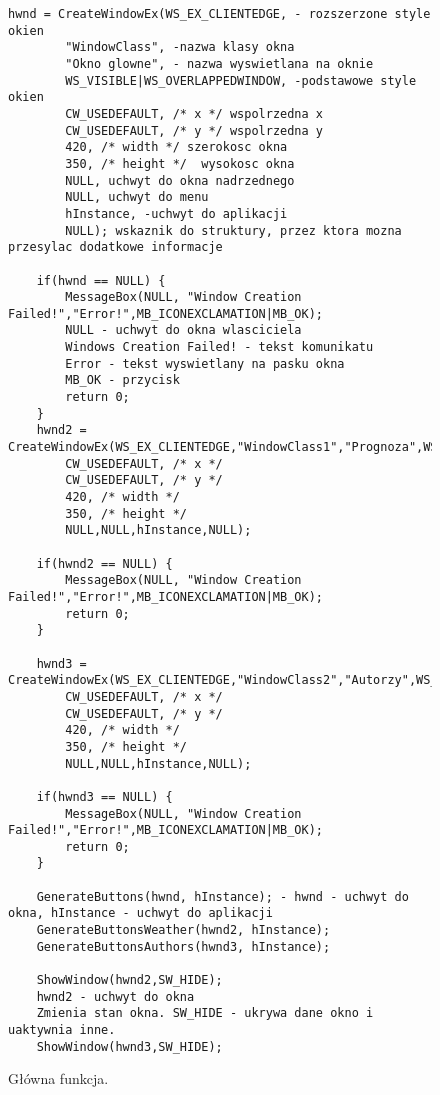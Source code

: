 \documentclass[a4paper,twoside,12pt]{mgr}
\begin{document}
\begin{figure}[H]
\centering
\begin{lstlisting}[frame=single]	
hwnd = CreateWindowEx(WS_EX_CLIENTEDGE, - rozszerzone style okien
		"WindowClass", -nazwa klasy okna
		"Okno glowne", - nazwa wyswietlana na oknie
		WS_VISIBLE|WS_OVERLAPPEDWINDOW, -podstawowe style okien
		CW_USEDEFAULT, /* x */ wspolrzedna x
		CW_USEDEFAULT, /* y */ wspolrzedna y
		420, /* width */ szerokosc okna
		350, /* height */  wysokosc okna
		NULL, uchwyt do okna nadrzednego
		NULL, uchwyt do menu
		hInstance, -uchwyt do aplikacji
		NULL); wskaznik do struktury, przez ktora mozna przesylac dodatkowe informacje

	if(hwnd == NULL) {
		MessageBox(NULL, "Window Creation Failed!","Error!",MB_ICONEXCLAMATION|MB_OK);
		NULL - uchwyt do okna wlasciciela
		Windows Creation Failed! - tekst komunikatu
		Error - tekst wyswietlany na pasku okna
		MB_OK - przycisk
		return 0;
	}
	hwnd2 = CreateWindowEx(WS_EX_CLIENTEDGE,"WindowClass1","Prognoza",WS_VISIBLE|WS_OVERLAPPEDWINDOW,
		CW_USEDEFAULT, /* x */
		CW_USEDEFAULT, /* y */
		420, /* width */
		350, /* height */
		NULL,NULL,hInstance,NULL);

	if(hwnd2 == NULL) {
		MessageBox(NULL, "Window Creation Failed!","Error!",MB_ICONEXCLAMATION|MB_OK);
		return 0;
	}
	
	hwnd3 = CreateWindowEx(WS_EX_CLIENTEDGE,"WindowClass2","Autorzy",WS_VISIBLE|WS_OVERLAPPEDWINDOW,
		CW_USEDEFAULT, /* x */
		CW_USEDEFAULT, /* y */
		420, /* width */
		350, /* height */
		NULL,NULL,hInstance,NULL);

	if(hwnd3 == NULL) {
		MessageBox(NULL, "Window Creation Failed!","Error!",MB_ICONEXCLAMATION|MB_OK);
		return 0;
	}

	GenerateButtons(hwnd, hInstance); - hwnd - uchwyt do okna, hInstance - uchwyt do aplikacji
	GenerateButtonsWeather(hwnd2, hInstance);
	GenerateButtonsAuthors(hwnd3, hInstance);
	
	ShowWindow(hwnd2,SW_HIDE);
	hwnd2 - uchwyt do okna
	Zmienia stan okna. SW_HIDE - ukrywa dane okno i uaktywnia inne.
	ShowWindow(hwnd3,SW_HIDE);
\end{lstlisting}
\caption{Główna funkcja.}%
\label{rys:etykieta}
\end{figure}	
\end{document}
